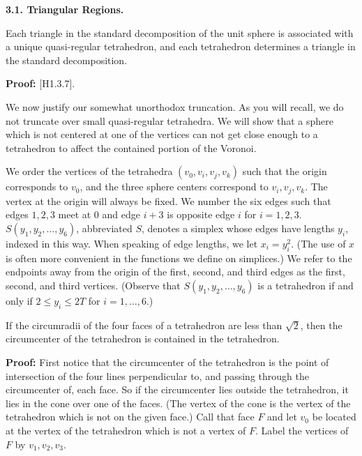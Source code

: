 \bigskip

{\bf 3.1. Triangular Regions.}

\bigskip

 Each triangle in the standard decomposition of 
the unit sphere is associated with a unique quasi-regular tetrahedron, 
and each tetrahedron determines a triangle in the standard decomposition.  
\endproclaim


{\bf Proof:} [H1.3.7].


\bigskip



We now justify our somewhat unorthodox truncation.  As you will recall, we 
do not truncate over small quasi-regular tetrahedra.
We will show that a sphere which is not centered at one of the vertices 
can not get close enough to a tetrahedron to 
affect the contained portion of the Voronoi.  


We order the vertices of the tetrahedra $(v_0,v_i,v_j,v_k)$ such that the 
origin corresponds to $v_0$, and the three sphere centers correspond to 
$v_i,v_j,v_k$.  The vertex at the origin will always be fixed.  We number 
the six edges such that edges $1,2,3$ meet at $0$ and edge $i+3$ is
 opposite edge $i$ for $i=1,2,3$. $S(y_1,y_2,\dots,y_6)$, abbreviated $S$,
 denotes a simplex whose edges have lengths $y_i$, indexed in this way. 
When speaking of edge lengths, we let $x_i=y_i^2$.  (The use of $x$ is 
often more convenient in the functions we define on simplices.)
 We refer to the endpoints away from the origin of the first, second, 
and third edges as the first, second, and third vertices.
 (Observe that $S(y_1,y_2,\dots,y_6)$ is a tetrahedron if and only if
$2\le y_i \le 2T$ for $i=1,\ldots,6$.)


 If the circumradii of the four faces of a 
tetrahedron are less than $\sqrt 2$,
 then the circumcenter of the tetrahedron is contained in the tetrahedron. 
\endproclaim

{\bf Proof:}  First notice that the circumcenter of the tetrahedron is
 the point of intersection of the four lines perpendicular to, and passing
 through the circumcenter of, each face.  So if the 
circumcenter lies outside the tetrahedron, it lies in the cone over
one of the faces.  (The vertex of the cone is the vertex of the tetrahedron which is not on the given face.)
   Call that face $F$ and let $v_0$ be located at the vertex of the
 tetrahedron which is not a vertex of $F$.  Label the vertices of $F$ 
by $v_1,v_2,v_3$.  

